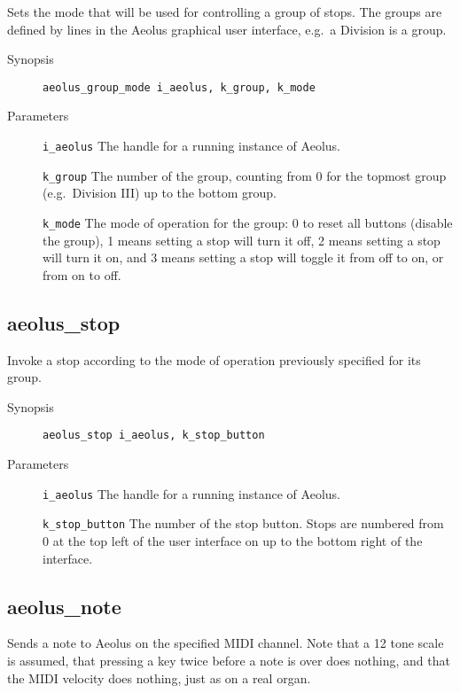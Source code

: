 \documentclass[english,11pt,letterpaper,onecolumn]{scrartcl}
\begin{document}
{Sets the mode that will be used for controlling a group of stops. The groups are defined by lines in the Aeolus graphical user interface, e.g.\ a Division is a group.

\begin{description}
	\item[Synopsis]
	\item[]\lstinline|aeolus_group_mode i_aeolus, k_group, k_mode|
	\item[Parameters]
	\item[]\lstinline|i_aeolus| The handle for a running instance of Aeolus.
	\item[]\lstinline|k_group| The number of the group, counting from 0 for the topmost group (e.g.\ Division III) up to the bottom group.
	\item[]\lstinline|k_mode| The mode of operation for the group: 0 to reset all buttons (disable the group), 1 means setting a stop will turn it off, 2 means setting a stop will turn it on, and 3 means setting a stop will toggle it from off to on, or from on to off.
\end{description}

\subsection*{aeolus\_stop}

Invoke a stop according to the mode of operation previously specified for its group.

\begin{description}
	\item[Synopsis]
	\item[]\lstinline|aeolus_stop i_aeolus, k_stop_button|
	\item[Parameters]
	\item[]\lstinline|i_aeolus| The handle for a running instance of Aeolus.
	\item[]\lstinline|k_stop_button| The number of the stop button. Stops are numbered from 0 at the top left of the user interface on up to the bottom right of the interface.
\end{description}

\subsection*{aeolus\_note}

Sends a note to Aeolus on the specified MIDI channel. Note that a 12 tone scale is assumed, that pressing a key twice before a note is over does nothing, and that the MIDI velocity does nothing, just as on a real organ. 

}
\end{document}
